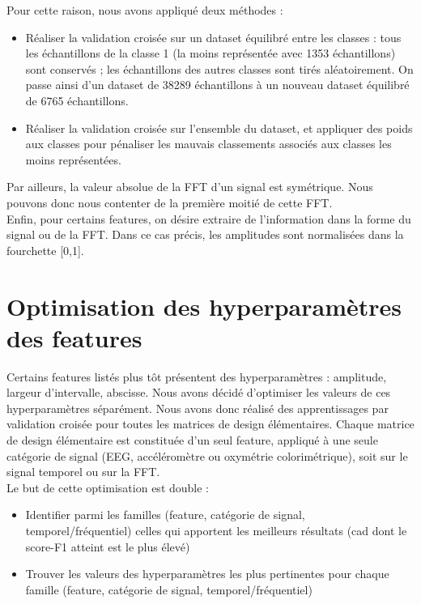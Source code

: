 \documentclass{article}
\begin{document}
Pour cette raison, nous avons appliqué deux méthodes :\\

\begin{itemize}
\item Réaliser la validation croisée sur un dataset équilibré entre les classes : tous les échantillons de la classe 1 (la moins représentée avec 1353 échantillons) sont conservés ; les échantillons des autres classes sont tirés aléatoirement. On passe ainsi d'un dataset de 38289 échantillons à un nouveau dataset équilibré de 6765 échantillons. 
\item Réaliser la validation croisée sur l'ensemble du dataset, et appliquer des poids aux classes pour pénaliser les mauvais classements associés aux classes les moins représentées.
\end{itemize}
\vspace{0.5cm}

Par ailleurs, la valeur absolue de la FFT d'un signal est symétrique. Nous pouvons donc nous contenter de la première moitié de cette FFT. \\

Enfin, pour certains features, on désire extraire de l'information dans la forme du signal ou de la FFT. Dans ce cas précis, les amplitudes sont normalisées dans la fourchette [0,1].\\

\section{Optimisation des hyperparamètres des features}

Certains features listés plus tôt présentent des hyperparamètres : amplitude, largeur d'intervalle, abscisse. Nous avons décidé d'optimiser les valeurs de ces hyperparamètres séparément. Nous avons donc réalisé des apprentissages par validation croisée pour toutes les matrices de design élémentaires. Chaque matrice de design élémentaire est constituée d'un seul feature, appliqué à une seule catégorie de signal (EEG, accéléromètre ou oxymétrie colorimétrique), soit sur le signal temporel ou sur la FFT.\\

Le but de cette optimisation est double :\\
\begin{itemize}
\item Identifier parmi les familles (feature, catégorie de signal, temporel/fréquentiel) celles qui apportent les meilleurs résultats (cad dont le score-F1 atteint est le plus élevé)
\item Trouver les valeurs des hyperparamètres les plus pertinentes pour chaque famille (feature, catégorie de signal, temporel/fréquentiel)
\end{itemize}
\vspace{0.5cm}
\end{document}
